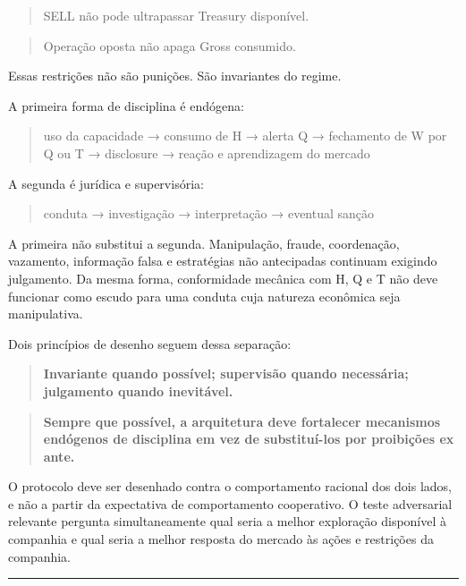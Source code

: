 \documentclass[
  a4paper,
]{article}
\begin{document}
\begin{quote}
SELL não pode ultrapassar Treasury disponível.
\end{quote}

\begin{quote}
Operação oposta não apaga Gross consumido.
\end{quote}

Essas restrições não são punições. São invariantes do regime.

A primeira forma de disciplina é endógena:

\begin{quote}
uso da capacidade → consumo de H → alerta Q → fechamento de W por Q ou T
→ disclosure → reação e aprendizagem do mercado
\end{quote}

A segunda é jurídica e supervisória:

\begin{quote}
conduta → investigação → interpretação → eventual sanção
\end{quote}

A primeira não substitui a segunda. Manipulação, fraude, coordenação,
vazamento, informação falsa e estratégias não antecipadas continuam
exigindo julgamento. Da mesma forma, conformidade mecânica com H, Q e T
não deve funcionar como escudo para uma conduta cuja natureza econômica
seja manipulativa.

Dois princípios de desenho seguem dessa separação:

\begin{quote}
\textbf{Invariante quando possível; supervisão quando necessária;
julgamento quando inevitável.}
\end{quote}

\begin{quote}
\textbf{Sempre que possível, a arquitetura deve fortalecer mecanismos
endógenos de disciplina em vez de substituí-los por proibições ex ante.}
\end{quote}

O protocolo deve ser desenhado contra o comportamento racional dos dois
lados, e não a partir da expectativa de comportamento cooperativo. O
teste adversarial relevante pergunta simultaneamente qual seria a melhor
exploração disponível à companhia e qual seria a melhor resposta do
mercado às ações e restrições da companhia.

\begin{center}\rule{0.5\linewidth}{0.5pt}\end{center}
\end{document}
